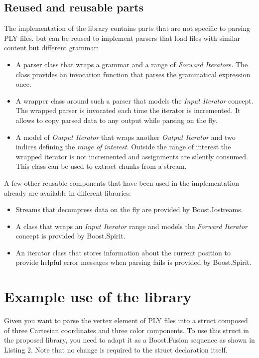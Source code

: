 \documentclass[a4paper,parskip=half,twocolumn]{scrartcl}
\begin{document}
\subsection{Reused and reusable parts}

The implementation of the library contains parts that are not specific to
parsing PLY files, but can be reused to implement parsers that load files with
similar content but different grammar:

\begin{itemize}
  \item A parser class that wraps a grammar and a range of \emph{Forward
  Iterator}s. The class provides an invocation function that parses the
  grammatical expression once.
  \item A wrapper class around such a parser that models the \emph{Input
  Iterator} concept. The wrapped parser is invocated each time the iterator is
  incremented. It allows to copy parsed data to any output while parsing on the
  fly.
  \item A model of \emph{Output Iterator} that wraps another \emph{Output
  Iterator} and two indices defining the \emph{range of interest}. Outside the
  range of interest the wrapped iterator is not incremented and assignments are
  silently consumed. This class can be used to extract chunks from a stream.
\end{itemize}

A few other reusable components that have been used in the implementation
already are available in different libraries:

\begin{itemize}
  \item Streams that decompress data on the fly are provided by Boost.Iostreams.
  \item A class that wraps an \emph{Input Iterator} range and models the
  \emph{Forward Iterator} concept is provided by Boost.Spirit.
  \item An iterator class that stores information about the current position to
  provide helpful error messages when parsing fails is provided by Boost.Spirit.
\end{itemize}

\section{Example use of the library}

Given you want to parse the vertex element of PLY files into a struct composed
of three Cartesian coordinates and three color components. To use this struct in
the proposed library, you need to adapt it as a Boost.Fusion sequence as shown
in Listing 2. Note that no change is required to the struct declaration itself.
\end{document}
